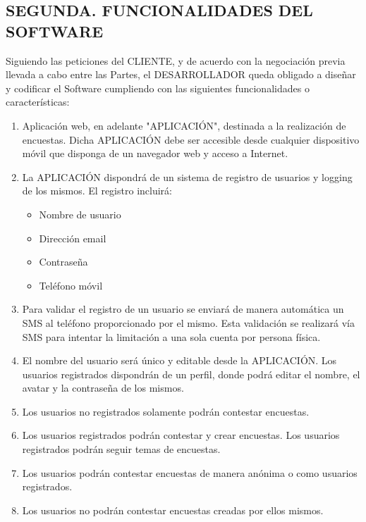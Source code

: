 \documentclass[a4paper,11pt]{report}
\begin{document}
	\subsection*{SEGUNDA. FUNCIONALIDADES DEL SOFTWARE}

	Siguiendo las peticiones del CLIENTE, y de acuerdo con la negociación
	previa llevada a cabo entre las Partes, el DESARROLLADOR queda obligado
	a diseñar y codificar el Software cumpliendo con las siguientes
	funcionalidades o características:
	\begin{enumerate}
		\item Aplicación web, en adelante "{APLICACIÓN}", destinada a la realización
		de encuestas. Dicha APLICACIÓN debe ser accesible desde cualquier
		dispositivo móvil que disponga de un navegador web y acceso a Internet.
		\item La APLICACIÓN dispondrá de un sistema de registro de usuarios y logging
		de los mismos. El registro incluirá:
			\begin{itemize}
				\item Nombre de usuario
				\item Dirección email
				\item Contraseña
				\item Teléfono móvil
			\end{itemize}
		\item Para validar el registro de un usuario se enviará de manera automática
		un SMS al teléfono proporcionado por el mismo. Esta validación se
		realizará vía SMS para intentar la limitación a una sola cuenta
		por persona física.

		\item El nombre del usuario será único y editable desde la APLICACIÓN.
		Los usuarios registrados dispondrán de un perfil, donde podrá editar el
		nombre, el avatar y la contraseña de los mismos.

		\item Los usuarios no registrados solamente podrán contestar encuestas.

		\item Los usuarios registrados podrán contestar y crear encuestas. Los
		usuarios registrados podrán seguir temas de encuestas.

		\item Los usuarios podrán contestar encuestas de manera anónima o
		como usuarios registrados.

		\item Los usuarios no podrán contestar encuestas creadas por ellos mismos.


\end{enumerate}
\end{document}
